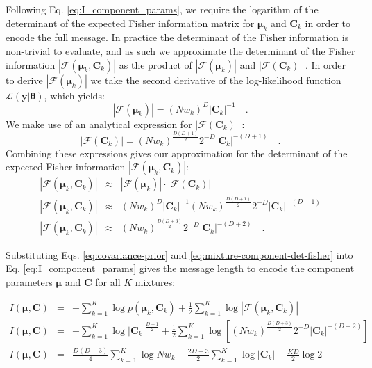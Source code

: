 \documentclass{elsarticle}
\newcommand{\vect}[1]{\boldsymbol{\mathbf{#1}}}
\def\cov{C}
\def\veccov{\vect{\cov}}
\def\vecmean{\vect{\mu}}
\def\vectheta{\vect{\theta}}
\def\weight{w}
\def\datum{y}
\def\data{\vect{\datum}}
\def\likelihood{\mathcal{L}}
\newcommand{\fisher}[1]{\mathcal{F}\left(#1\right)}
\newcommand{\detfisher}[1]{\left|\fisher{#1}\right|}
\newcommand{\prior}[1]{p\left(#1\right)}
\begin{document}
Following Eq. \ref{eq:I_component_params}, we require the logarithm of the
determinant of the expected Fisher information matrix for $\vecmean_k$ and
$\veccov_k$ in order to encode the full message. In practice the determinant
of the Fisher information is non-trivial to evaluate, and as such we
approximate the determinant of the Fisher information
 $\detfisher{{\vecmean_k, \veccov_k}}$ 
as the product of $\detfisher{\vecmean_k}$ and $\detfisher{\veccov_k}$ 
\cite{Oliver_1996,Roberts_1998}. In order to derive $\detfisher{\vecmean_k}$
we take the second derivative of the log-likelihood function 
$\likelihood(\data|\vectheta)$, which yields:
\begin{equation}
  \detfisher{\vecmean_k} = (N\weight_k)^{D}|\veccov_k|^{-1} \quad .
\end{equation}
We make use of an analytical expression for $\detfisher{\veccov_k}$
\cite{Dwyer_1967,Magnus_1988}:
\begin{equation}
  \detfisher{\veccov_k} = (N\weight_k)^\frac{D(D+1)}{2}2^{-D}|\veccov_k|^{-(D+1)} \quad .
\end{equation}
Combining these expressions gives our approximation for the determinant of
the expected Fisher information $\detfisher{{\vecmean_k,\veccov_k}}$:
\begin{eqnarray}
  \detfisher{{\vecmean_k,\veccov_k}} & \approx & \detfisher{\vecmean_k} \cdot \detfisher{\veccov_k} \nonumber \\
  \detfisher{{\vecmean_k,\veccov_k}} & \approx & (N\weight_k)^{D}|\veccov_k|^{-1}(N\weight_k)^\frac{D(D+1)}{2}2^{-D}|\veccov_k|^{-(D+1)} \nonumber \\
  \detfisher{{\vecmean_k,\veccov_k}} & \approx & (N\weight_k)^\frac{D(D+3)}{2}2^{-D}|\veccov_k|^{-(D+2)} \quad .
  \label{eq:mixture-component-det-fisher}
\end{eqnarray}


Substituting Eqs. \ref{eq:covariance-prior} and \ref{eq:mixture-component-det-fisher} 
into Eq. \ref{eq:I_component_params} gives the message length to encode the component
parameters $\vecmean$ and $\veccov$ for all $K$ mixtures:

\begin{eqnarray}
  I(\vecmean,\veccov) &=& -\sum_{k=1}^{K}\log{\prior{{\vecmean_k,\veccov_k}}} + \frac{1}{2}\sum_{k=1}^{K}\log{\detfisher{{\vecmean_k,\veccov_k}}} \nonumber \\
  I(\vecmean,\veccov) &=& -\sum_{k=1}^{K}\log{|\veccov_k|^{\frac{D + 1}{2}}}
    + \frac{1}{2}\sum_{k=1}^{K}\log{\left[(N\weight_k)^\frac{D(D+3)}{2}2^{-D}|\veccov_k|^{-(D+2)}\right]} \nonumber \\
  I(\vecmean,\veccov) &=& \frac{D(D+3)}{4}\sum_{k=1}^{K}\log{N\weight_k} -\frac{2D+3}{2}\sum_{k=1}^{K}\log{|\veccov_k|} - \frac{KD}{2}\log{2} 
\end{eqnarray}
\end{document}
